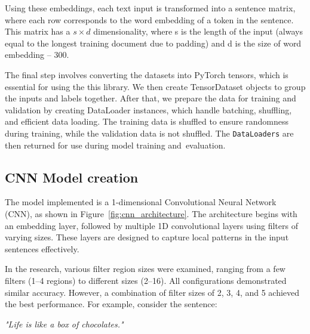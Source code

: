 Using these embeddings, each text input is transformed into a sentence matrix, where each row corresponds to the word embedding of a token in the sentence. This matrix has a \( s\times d \) dimensionality, where s is the length of the input (always equal to the longest training document due to padding) and d is the size of word embedding -- 300.

\vspace{3mm} 

The final step involves converting the datasets into PyTorch tensors, which is essential for using the this library. We then create TensorDataset objects to group the inputs and labels together. After that, we prepare the data for training and validation by creating DataLoader instances, which handle batching, shuffling, and efficient data loading. The training data is shuffled to ensure randomness during training, while the validation data is not shuffled. The \texttt{DataLoaders} are then returned for use during model training and~evaluation.

\vspace{3mm} 

\subsection*{CNN Model creation}
\label{CNN model creation}

The model implemented is a 1-dimensional Convolutional Neural Network (CNN), as shown in Figure~\ref{fig:cnn_architecture}. The architecture begins with an embedding layer, followed by multiple 1D convolutional layers using filters of varying sizes. These layers are designed to capture local patterns in the input sentences effectively.

\vspace{3mm} 

In the research, various filter region sizes were examined, ranging from a few filters (1–4 regions) to different sizes (2–16). All configurations demonstrated similar accuracy. However, a combination of filter sizes of 2, 3, 4, and 5 achieved the best performance. For example, consider the sentence: 

\newpage

\begin{center}
    \textit{"Life is like a box of chocolates."}
\end{center}

\vspace{3mm} 

